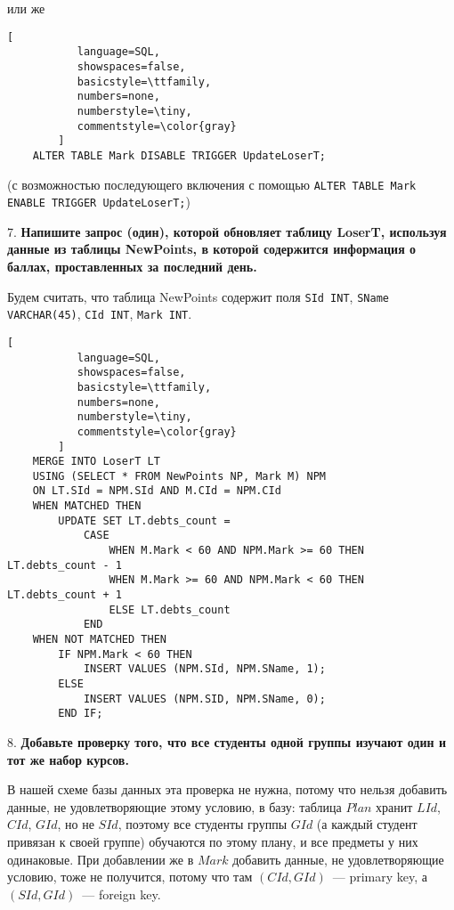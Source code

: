 \documentclass[11pt,a4paper,oneside]{article}
\begin{document}
или же

\begin{lstlisting}[
           language=SQL,
           showspaces=false,
           basicstyle=\ttfamily,
           numbers=none,
           numberstyle=\tiny,
           commentstyle=\color{gray}
        ]
    ALTER TABLE Mark DISABLE TRIGGER UpdateLoserT;
\end{lstlisting}

(с возможностью последующего включения с помощью \texttt{ALTER TABLE Mark ENABLE TRIGGER UpdateLoserT;})

7. \textbf{Напишите запрос (один), которой обновляет таблицу LoserT, используя данные из таблицы NewPoints, в которой содержится информация о баллах, проставленных за последний день.}

Будем считать, что таблица NewPoints содержит поля \texttt{SId INT}, \texttt{SName VARCHAR(45)}, \texttt{CId INT}, \texttt{Mark INT}.

\begin{lstlisting}[
           language=SQL,
           showspaces=false,
           basicstyle=\ttfamily,
           numbers=none,
           numberstyle=\tiny,
           commentstyle=\color{gray}
        ]
    MERGE INTO LoserT LT
    USING (SELECT * FROM NewPoints NP, Mark M) NPM
    ON LT.SId = NPM.SId AND M.CId = NPM.CId
    WHEN MATCHED THEN
        UPDATE SET LT.debts_count = 
            CASE 
                WHEN M.Mark < 60 AND NPM.Mark >= 60 THEN LT.debts_count - 1
                WHEN M.Mark >= 60 AND NPM.Mark < 60 THEN LT.debts_count + 1
                ELSE LT.debts_count
            END
    WHEN NOT MATCHED THEN
        IF NPM.Mark < 60 THEN
            INSERT VALUES (NPM.SId, NPM.SName, 1);
        ELSE
            INSERT VALUES (NPM.SID, NPM.SName, 0);
        END IF;
\end{lstlisting}

8. \textbf{Добавьте проверку того, что все студенты одной группы изучают один и тот же набор курсов.}

    В нашей схеме базы данных эта проверка не нужна, потому что нельзя добавить данные, не удовлетворяющие этому условию, в базу: таблица $Plan$ хранит $LId$, $CId$, $GId$, но не $SId$, поэтому все студенты группы $GId$ (а каждый студент привязан к своей группе) обучаются по этому плану, и все предметы у них одинаковые. При добавлении же в $Mark$ добавить данные, не удовлетворяющие условию, тоже не получится, потому что там $(CId, GId)$~--- primary key, а $(SId, GId)$~--- foreign key.
\end{document}
